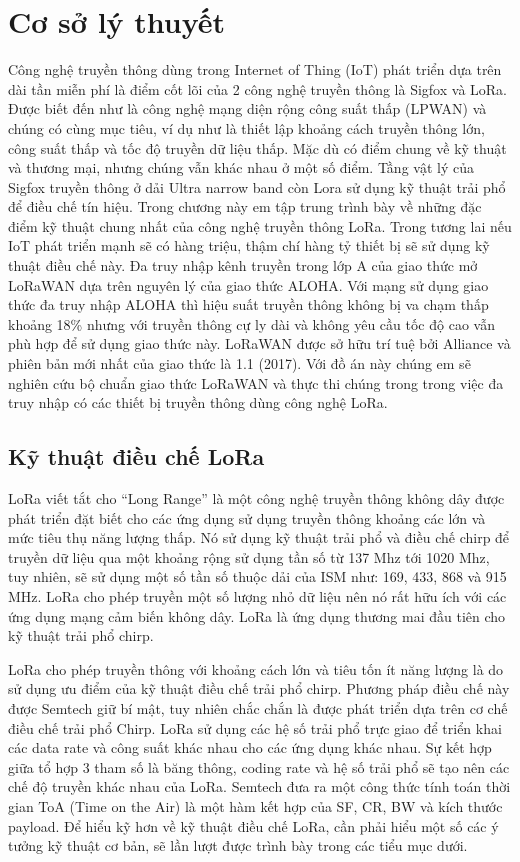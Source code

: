 \chapter{Cơ sở lý thuyết}
\label{chapter2}
Công nghệ truyền thông dùng trong Internet of Thing (IoT) phát triển dựa trên dài tần miễn phí là điểm cốt lõi của 2 công nghệ truyền thông là Sigfox và LoRa. Được biết đến như là công nghệ mạng diện rộng công suất thấp (LPWAN) và chúng có cùng mục tiêu, ví dụ như là thiết lập khoảng cách truyền thông lớn, công suất thấp và tốc độ truyền dữ liệu thấp. Mặc dù có điểm chung về kỹ thuật và thương mại, nhưng chúng vẫn khác nhau ở một số điểm. Tầng vật lý của Sigfox truyền thông ở dải Ultra narrow band còn Lora sử dụng kỹ thuật trải phổ để điều chế tín hiệu. Trong chương này em tập trung trình bày về những đặc điểm kỹ thuật chung nhất của công nghệ truyền thông LoRa. Trong tương lai nếu IoT phát triển mạnh sẽ có hàng triệu, thậm chí hàng tỷ thiết bị sẽ sử dụng kỹ thuật điều chế này. Đa truy nhập kênh truyền trong lớp A của giao thức mở LoRaWAN dựa trên nguyên lý của giao thức ALOHA. Với mạng sử dụng giao thức đa truy nhập ALOHA thì hiệu suất truyền thông không bị va chạm thấp khoảng 18\% nhưng với truyền thông cự ly dài và không yêu cầu tốc độ cao vẫn phù hợp để sử dụng giao thức này. LoRaWAN được sở hữu trí tuệ bởi Alliance và phiên bản mới nhất của giao thức là 1.1 (2017). Với đồ án này chúng em sẽ nghiên cứu bộ chuẩn giao thức LoRaWAN và thực thi chúng trong trong việc đa truy nhập có các thiết bị truyền thông dùng công nghệ LoRa. 

\section{Kỹ thuật điều chế LoRa}

LoRa viết tắt cho “Long Range” là một công nghệ truyền thông không dây được phát triển đặt biết cho các ứng dụng sử dụng truyền thông khoảng các lớn và mức tiêu thụ năng lượng thấp. Nó sử dụng kỹ thuật trải phổ và điều chế chirp để truyền dữ liệu qua một khoảng rộng sử dụng tần số từ 137 Mhz tới 1020 Mhz, tuy nhiên, sẽ sử dụng một số tần số thuộc dải của ISM như: 169, 433, 868 và 915 MHz. LoRa cho phép truyền một số lượng nhỏ dữ liệu nên nó rất hữu ích với các ứng dụng mạng cảm biến không dây. LoRa là ứng dụng thương mai đầu tiên cho kỹ thuật trải phổ chirp. \par
	LoRa cho phép truyền thông với khoảng cách lớn và tiêu tốn ít năng lượng là do sử dụng ưu điểm của kỹ thuật điều chế trải phổ chirp. Phương pháp điều chế này được Semtech giữ bí mật, tuy nhiên chắc chắn là được phát triển dựa trên cơ chế điều chế trải phổ Chirp. LoRa sử dụng các hệ số trải phổ trực giao để triển khai các data rate và công suất khác nhau cho các ứng dụng khác nhau. Sự kết hợp giữa tổ hợp 3 tham số là băng thông, coding rate và hệ số trải phổ sẽ tạo nên các chế độ truyền khác nhau của LoRa. Semtech đưa ra một công thức tính toán thời gian ToA (Time on the Air) là một hàm kết hợp của SF, CR, BW và kích thước payload. Để hiểu kỹ hơn về kỹ thuật điều chế LoRa, cần phải hiểu một số các ý tưởng kỹ thuật cơ bản, sẽ lần lượt được trình bày trong các tiểu mục dưới. 
	

